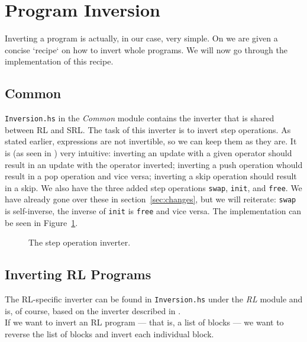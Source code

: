 \section{Program Inversion}

Inverting a program is actually, in our case, very simple. On \cite[p.~104]{REV} we are given a concise `recipe` on how to invert whole programs. We will now go through the implementation of this recipe.

\subsection{Common}
\label{sec:invcommon}

\texttt{Inversion.hs} in the \textit{Common} module contains the inverter that is shared between RL and SRL. The task of this inverter is to invert step operations. As stated earlier, expressions are not invertible, so we can keep them as they are. It is (as seen in \cite[Fig.~20]{REV}) very intuitive: inverting an update with a given operator should result in an update with the operator inverted; inverting a push operation whould result in a pop operation and vice versa; inverting a skip operation should result in a skip. We also have the three added step operations \texttt{swap}, \texttt{init}, and \texttt{free}. We have already gone over these in section~\ref{sec:changes}, but we will reiterate: \texttt{swap} is self-inverse, the inverse of \texttt{init} is \texttt{free} and vice versa. The implementation can be seen in Figure~\ref{fig:commoninvert}.

\begin{figure}[H]
  
  \caption{The step operation inverter.}\label{fig:commoninvert}
\end{figure}

\subsection{Inverting RL Programs}

The RL-specific inverter can be found in \texttt{Inversion.hs} under the \textit{RL} module and is, of course, based on the inverter described in \cite[Fig.~19]{REV}.\\

\noindent If we want to invert an RL program --- that is, a list of blocks --- we want to reverse the list of blocks and invert each individual block.\\

